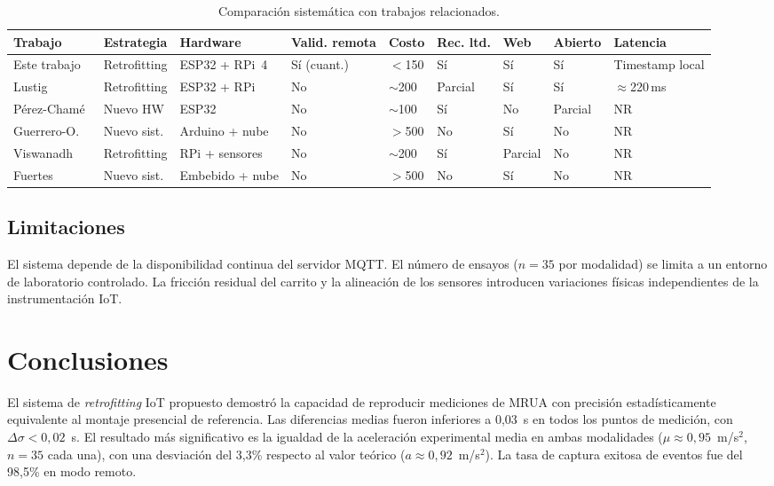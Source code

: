 \documentclass[12pt,twoside,titlepage]{ingenius}
\begin{document}
\begin{multicols}{2}
\begin{table}[t]
\caption{Comparaci\'on sistem\'atica con trabajos relacionados.}
\label{tab:comparacion}
\centering
\scriptsize
\renewcommand{\arraystretch}{1.3}
\begin{tabular}{p{2.0cm}p{1.3cm}p{1.5cm}p{1.8cm}p{0.8cm}p{0.8cm}p{0.6cm}p{0.6cm}p{3.0cm}}
\toprule
\textbf{Trabajo} & \textbf{Estrategia} & \textbf{Hardware} & \textbf{Valid. remota} & \textbf{Costo} & \textbf{Rec. ltd.} & \textbf{Web} & \textbf{Abierto} & \textbf{Latencia} \\
\midrule
Este trabajo & Retrofitting & ESP32 + RPi~4 & S\'i (cuant.) & $<$150 & S\'i & S\'i & S\'i & Timestamp local \\
Lustig~\cite{r10} & Retrofitting & ESP32 + RPi & No & $\sim$200 & Parcial & S\'i & S\'i & $\approx$220\,ms \\
P\'erez-Cham\'e~\cite{r11} & Nuevo HW & ESP32 & No & $\sim$100 & S\'i & No & Parcial & NR \\
Guerrero-O.~\cite{r4} & Nuevo sist. & Arduino + nube & No & $>$500 & No & S\'i & No & NR \\
Viswanadh~\cite{r2} & Retrofitting & RPi + sensores & No & $\sim$200 & S\'i & Parcial & No & NR \\
Fuertes~\cite{r3} & Nuevo sist. & Embebido + nube & No & $>$500 & No & S\'i & No & NR \\
\bottomrule
\end{tabular}
\end{table}

\subsection{Limitaciones}

El sistema depende de la disponibilidad continua del servidor MQTT. El n\'umero de ensayos ($n=35$ por modalidad) se limita a un entorno de laboratorio controlado. La fricci\'on residual del carrito y la alineaci\'on de los sensores introducen variaciones f\'isicas independientes de la instrumentaci\'on IoT.

\section{Conclusiones}

El sistema de \textit{retrofitting} IoT propuesto demostr\'o la capacidad de reproducir mediciones de MRUA con precisi\'on estad\'isticamente equivalente al montaje presencial de referencia. Las diferencias medias fueron inferiores a 0,03~s en todos los puntos de medici\'on, con $\Delta\sigma < 0{,}02$~s. El resultado m\'as significativo es la igualdad de la aceleraci\'on experimental media en ambas modalidades ($\mu \approx 0{,}95$~m/s$^2$, $n = 35$ cada una), con una desviaci\'on del 3,3\% respecto al valor te\'orico ($a \approx 0{,}92$~m/s$^2$). La tasa de captura exitosa de eventos fue del 98,5\% en modo remoto.


\end{multicols}
\end{document}
